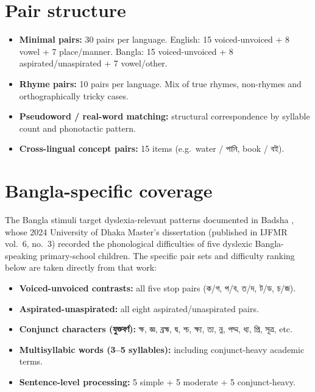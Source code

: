 \section*{Pair structure}

\begin{itemize}
    \item \textbf{Minimal pairs:} 30 pairs per language. English: 15 voiced-unvoiced + 8 vowel + 7 place/manner. Bangla: 15 voiced-unvoiced + 8 aspirated/unaspirated + 7 vowel/other.
    \item \textbf{Rhyme pairs:} 10 pairs per language. Mix of true rhymes, non-rhymes and orthographically tricky cases.
    \item \textbf{Pseudoword / real-word matching:} structural correspondence by syllable count and phonotactic pattern.
    \item \textbf{Cross-lingual concept pairs:} 15 items (e.g.\ water / {\banglafont পানি}, book / {\banglafont বই}).
\end{itemize}

\section*{Bangla-specific coverage}

The Bangla stimuli target dyslexia-relevant patterns documented in Badsha \cite{badsha2024mall}, whose 2024 University of Dhaka Master's dissertation (published in IJFMR vol.\ 6, no.\ 3) recorded the phonological difficulties of five dyslexic Bangla-speaking primary-school children. The specific pair sets and difficulty ranking below are taken directly from that work:
\begin{itemize}
    \item \textbf{Voiced-unvoiced contrasts:} all five stop pairs ({\banglafont ক/গ}, {\banglafont প/ব}, {\banglafont ত/দ}, {\banglafont ট/ড}, {\banglafont চ/জ}).
    \item \textbf{Aspirated-unaspirated:} all eight aspirated/unaspirated pairs.
    \item \textbf{Conjunct characters ({\banglafont যুক্তবর্ণ}):} {\banglafont ক্ষ}, {\banglafont জ্ঞ}, {\banglafont ব্রহ্ম}, {\banglafont দ্ব}, {\banglafont শ্চ}, {\banglafont ক্ষ্য}, {\banglafont ত্য}, {\banglafont ন্ন}, {\banglafont পদ্ম}, {\banglafont ধ্য}, {\banglafont প্রি}, {\banglafont সূত্র}, etc.
    \item \textbf{Multisyllabic words (3--5 syllables):} including conjunct-heavy academic terms.
    \item \textbf{Sentence-level processing:} 5 simple + 5 moderate + 5 conjunct-heavy.
\end{itemize}

